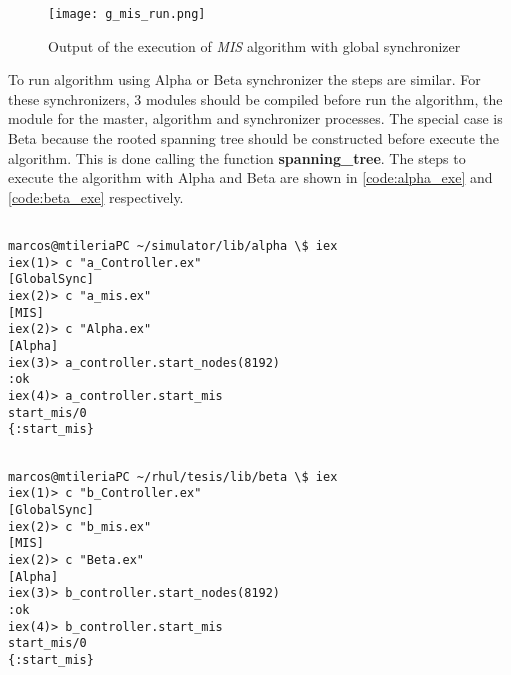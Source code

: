 \begin{figure}[ht]
\centering
\texttt{[image: g\_mis\_run.png]} 
\caption{Output of the execution of \textit{MIS} algorithm with global synchronizer}
\label{fig:gmis_run}
\end{figure}

To run algorithm using Alpha or Beta synchronizer the steps are similar. For these synchronizers, 3 modules should be compiled before run the algorithm, the module for the master, algorithm and synchronizer processes. The special case is Beta because the rooted spanning tree should be constructed before execute the algorithm. This is done calling the function \textbf{spanning\_tree}. The steps to execute the algorithm with Alpha and Beta are shown in \ref{code:alpha_exe} and \ref{code:beta_exe} respectively.

\begin{lstlisting}[style=terminal,caption= Example of compiling and executing the algorithm with Alpha, label = code:alpha_exe]

marcos@mtileriaPC ~/simulator/lib/alpha \$ iex
iex(1)> c "a_Controller.ex"
[GlobalSync]
iex(2)> c "a_mis.ex"     
[MIS]
iex(2)> c "Alpha.ex"     
[Alpha]
iex(3)> a_controller.start_nodes(8192)
:ok
iex(4)> a_controller.start_mis        
start_mis/0    
{:start_mis}
\end{lstlisting}

\begin{lstlisting}[style=terminal,caption= Example of compiling and executing the algorithm with Beta, label = code:beta_exe]

marcos@mtileriaPC ~/rhul/tesis/lib/beta \$ iex
iex(1)> c "b_Controller.ex"
[GlobalSync]
iex(2)> c "b_mis.ex"     
[MIS]
iex(2)> c "Beta.ex"     
[Alpha]
iex(3)> b_controller.start_nodes(8192)
:ok
iex(4)> b_controller.start_mis        
start_mis/0    
{:start_mis}

\end{lstlisting}

